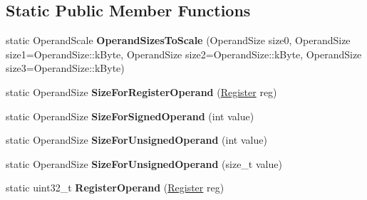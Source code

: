 \subsection*{Static Public Member Functions}
\begin{DoxyCompactItemize}
\item 
static Operand\+Scale {\bfseries Operand\+Sizes\+To\+Scale} (Operand\+Size size0, Operand\+Size size1=Operand\+Size\+::k\+Byte, Operand\+Size size2=Operand\+Size\+::k\+Byte, Operand\+Size size3=Operand\+Size\+::k\+Byte)\hypertarget{classv8_1_1internal_1_1interpreter_1_1_bytecode_array_builder_a0e4313dfb2dda386282d01b3baca16b5}{}\label{classv8_1_1internal_1_1interpreter_1_1_bytecode_array_builder_a0e4313dfb2dda386282d01b3baca16b5}

\item 
static Operand\+Size {\bfseries Size\+For\+Register\+Operand} (\hyperlink{classv8_1_1internal_1_1interpreter_1_1_register}{Register} reg)\hypertarget{classv8_1_1internal_1_1interpreter_1_1_bytecode_array_builder_aedb14bddd1e7ad4396e17e6a39273369}{}\label{classv8_1_1internal_1_1interpreter_1_1_bytecode_array_builder_aedb14bddd1e7ad4396e17e6a39273369}

\item 
static Operand\+Size {\bfseries Size\+For\+Signed\+Operand} (int value)\hypertarget{classv8_1_1internal_1_1interpreter_1_1_bytecode_array_builder_ae7aeb85252e5febf251b844dd974613d}{}\label{classv8_1_1internal_1_1interpreter_1_1_bytecode_array_builder_ae7aeb85252e5febf251b844dd974613d}

\item 
static Operand\+Size {\bfseries Size\+For\+Unsigned\+Operand} (int value)\hypertarget{classv8_1_1internal_1_1interpreter_1_1_bytecode_array_builder_a5f5c4e4fb1ff3b8ca9716d6857a5a0ac}{}\label{classv8_1_1internal_1_1interpreter_1_1_bytecode_array_builder_a5f5c4e4fb1ff3b8ca9716d6857a5a0ac}

\item 
static Operand\+Size {\bfseries Size\+For\+Unsigned\+Operand} (size\+\_\+t value)\hypertarget{classv8_1_1internal_1_1interpreter_1_1_bytecode_array_builder_a4f5746579117b69fb82af56507213187}{}\label{classv8_1_1internal_1_1interpreter_1_1_bytecode_array_builder_a4f5746579117b69fb82af56507213187}

\item 
static uint32\+\_\+t {\bfseries Register\+Operand} (\hyperlink{classv8_1_1internal_1_1interpreter_1_1_register}{Register} reg)\hypertarget{classv8_1_1internal_1_1interpreter_1_1_bytecode_array_builder_a71ca37f711c66cbfcb2d5e14c060c5d8}{}\label{classv8_1_1internal_1_1interpreter_1_1_bytecode_array_builder_a71ca37f711c66cbfcb2d5e14c060c5d8}


\end{DoxyCompactItemize}
